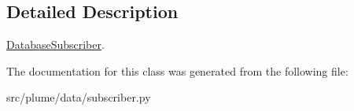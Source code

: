\subsection{Detailed Description}
\hyperlink{classplume-creator_1_1src_1_1plume_1_1data_1_1subscriber_1_1_database_subscriber}{Database\+Subscriber}. 

The documentation for this class was generated from the following file\+:\begin{DoxyCompactItemize}
\item 
src/plume/data/subscriber.\+py\end{DoxyCompactItemize}
